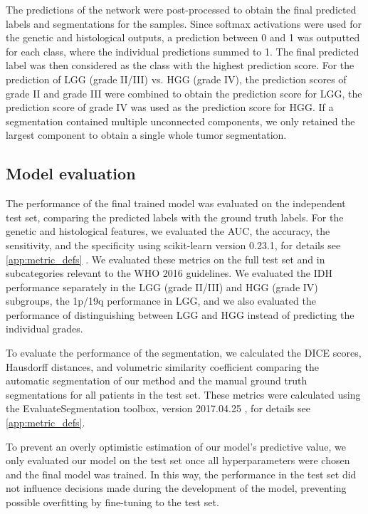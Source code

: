 The predictions of the network were post-processed to obtain the final predicted labels and segmentations for the samples.
Since softmax activations were used for the genetic and histological outputs, a prediction between 0 and 1 was outputted for each class, where the individual predictions summed to 1.
The final predicted label was then considered as the class with the highest prediction score.
For the prediction of \gls{LGG} (grade II/III) vs. \gls{HGG} (grade IV), the prediction scores of grade II and grade III were combined to obtain the prediction score for \gls{LGG}, the prediction score of grade IV was used as the prediction score for \gls{HGG}.
If a segmentation contained multiple unconnected components, we only retained the largest component to obtain a single whole \gls{tumor} segmentation.

\subsection{Model evaluation}

The performance of the final trained model was evaluated on the independent test set, comparing the predicted labels with the ground truth labels.
For the genetic and histological features, we evaluated the \gls{AUC}, the accuracy, the sensitivity, and the specificity using scikit-learn version 0.23.1, for details see \cref{app:metric_defs} \autocite{pedregosa2011scikitlearn}.
We evaluated these metrics on the full test set and in subcategories relevant to the \gls{WHO} 2016 guidelines.
We evaluated the \gls{IDH} performance separately in the \gls{LGG} (grade II/III) and \gls{HGG} (grade IV) subgroups, the 1p/19q performance in \gls{LGG}, and we also evaluated the performance of distinguishing between \gls{LGG} and \gls{HGG} instead of predicting the individual grades.

To evaluate the performance of the segmentation, we calculated the DICE scores, Hausdorff distances, and volumetric similarity coefficient comparing the automatic segmentation of our method and the manual ground truth segmentations for all patients in the test set.
These metrics were calculated using the EvaluateSegmentation toolbox, version 2017.04.25 \autocite{taha2015metrics}, for details see \cref{app:metric_defs}.


To prevent an overly optimistic estimation of our model's predictive value, we only evaluated our model on the test set once all hyperparameters were chosen and the final model was trained.
In this way, the performance in the test set did not influence decisions made during the development of the model, preventing possible overfitting by fine-tuning to the test set.

